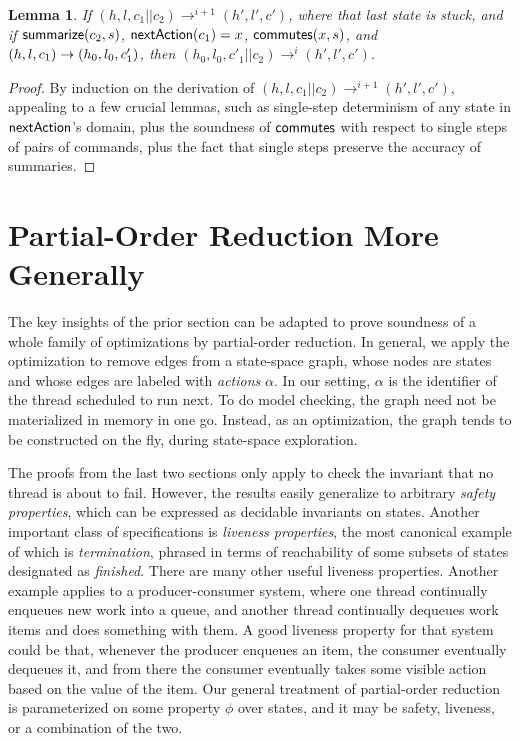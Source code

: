 \documentclass{amsbook}
\newtheorem{lemma}[theorem]{Lemma}
\theoremstyle{definition}
\theoremstyle{remark}
\numberwithin{section}{chapter}
\numberwithin{equation}{chapter}
\begin{document}
\begin{lemma}\label{translate_trace_commute}
  If $(h, l, c_1 || c_2) \to^{i+1} (h', l', c')$, where that last state is stuck, and if $\mathsf{summarize}(c_2, s)$, $\mathsf{nextAction}(c_1) = x$, $\mathsf{commutes}(x, s)$, and $(h, l, c_1) \to (h_0, l_0, c'_1)$, then $(h_0, l_0, c'_1 || c_2) \to^i (h', l', c')$.
\end{lemma}
\begin{proof}
  By induction on the derivation of $(h, l, c_1 || c_2) \to^{i+1} (h', l', c')$, appealing to a few crucial lemmas, such as single-step determinism of any state in $\mathsf{nextAction}$'s domain, plus the soundness of $\mathsf{commutes}$ with respect to single steps of pairs of commands, plus the fact that single steps preserve the accuracy of summaries.
\end{proof}

\section{Partial-Order Reduction More Generally}

The key insights of the prior section can be adapted to prove soundness of a whole family of optimizations by partial-order reduction.
In general, we apply the optimization to remove edges from a state-space graph, whose nodes are states and whose edges are labeled with \emph{actions} $\alpha$.
In our setting, $\alpha$ is the identifier of the thread scheduled to run next.
To do model checking, the graph need not be materialized in memory in one go.
Instead, as an optimization, the graph tends to be constructed on the fly, during state-space exploration.

The proofs from the last two sections only apply to check the invariant that no thread is about to fail.
However, the results easily generalize to arbitrary \emph{safety properties}, which can be expressed as decidable invariants on states.
Another important class of specifications is \emph{liveness properties}, the most canonical example of which is \emph{termination}, phrased in terms of reachability of some subsets of states designated as \emph{finished}.
There are many other useful liveness properties.
Another example applies to a producer-consumer system, where one thread continually enqueues new work into a queue, and another thread continually dequeues work items and does something with them.
A good liveness property for that system could be that, whenever the producer enqueues an item, the consumer eventually dequeues it, and from there the consumer eventually takes some visible action based on the value of the item.
Our general treatment of partial-order reduction is parameterized on some property $\phi$ over states, and it may be safety, liveness, or a combination of the two.
\end{document}
